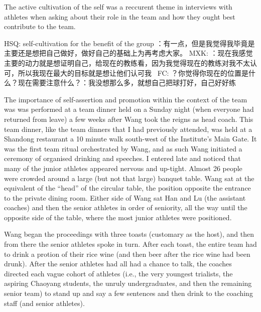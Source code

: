 

The active cultivation of the self was a reccurent theme in interviews with athletes when asking about their role in the team and how they ought best contribute to the team.

HSQ: self-cultivation for the benefit of the group
：有一点，但是我觉得我毕竟是主要还是想把自己做好，做好自己的基础上为再考虑大家。
MXK:
：现在我感觉主要的动力就是想证明自己，给现在的教练看，因为我觉得现在的教练对我不太认可，所以我现在最大的目标就是想让他们认可我 
FC:
？你觉得你现在的位置是什么？现在需要注意什么？：我没想那么多，就想自己把球打好，自己好好练


The importance of self-assertion and promotion within the context of the team was was performed at a team dinner held on a Sunday night (when everyone had returned from leave) a few weeks after Wang took the reigns as head coach.  This team dinner, like the team dinners that I had previously attended, was held at a Shandong restaurant a 10 minute walk south-west of the Institute's Main Gate.  It was the first team ritual orchestrated by Wang, and as such Wang initiated a ceremony of organised drinking and speeches.  I entered late and noticed that many of the junior athletes appeared nervous and up-tight. Almost 26 people were crowded around a large (but not that large) banquet table.  Wang sat at the equivalent of the ``head'' of the circular table, the position opposite the entrance to the private dining room.  Either side of Wang sat Han and Lu (the assistant coaches) and then the senior athletes in order of seniority, all the way until the opposite side of the table, where the most junior athletes were positioned.

Wang began the proceedings with three toasts (customary as the host), and then from there the senior athletes spoke in turn.  After each toast, the entire team had to drink a protion of their rice wine (and then beer after the rice wine had been drunk).  After the senior athletes had all had a chance to talk, the coaches directed each vague cohort of athletes (i.e., the very youngest trialists, the aspiring Chaoyang students, the unruly undergraduates, and then the remaining senior team) to stand up and say a few sentences and then drink to the coaching staff (and senior athletes).

